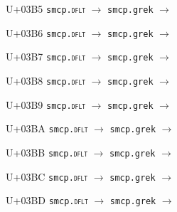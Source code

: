 \documentclass{article}
\begin{document}
\begin{substitutions}
\goodbreak

U+03B5  \linebreak
    \texttt{smcp.\textsc{dflt}} $\to$  \linebreak
    \texttt{smcp.grek} $\to$  

\goodbreak

U+03B6  \linebreak
    \texttt{smcp.\textsc{dflt}} $\to$  \linebreak
    \texttt{smcp.grek} $\to$  

\goodbreak

U+03B7  \linebreak
    \texttt{smcp.\textsc{dflt}} $\to$  \linebreak
    \texttt{smcp.grek} $\to$  

\goodbreak

U+03B8  \linebreak
    \texttt{smcp.\textsc{dflt}} $\to$  \linebreak
    \texttt{smcp.grek} $\to$  

\goodbreak

U+03B9  \linebreak
    \texttt{smcp.\textsc{dflt}} $\to$  \linebreak
    \texttt{smcp.grek} $\to$  

\goodbreak

U+03BA  \linebreak
    \texttt{smcp.\textsc{dflt}} $\to$  \linebreak
    \texttt{smcp.grek} $\to$  

\goodbreak

U+03BB  \linebreak
    \texttt{smcp.\textsc{dflt}} $\to$  \linebreak
    \texttt{smcp.grek} $\to$  

\goodbreak

U+03BC  \linebreak
    \texttt{smcp.\textsc{dflt}} $\to$  \linebreak
    \texttt{smcp.grek} $\to$  

\goodbreak

U+03BD  \linebreak
    \texttt{smcp.\textsc{dflt}} $\to$  \linebreak
    \texttt{smcp.grek} $\to$  


\end{substitutions}
\end{document}
